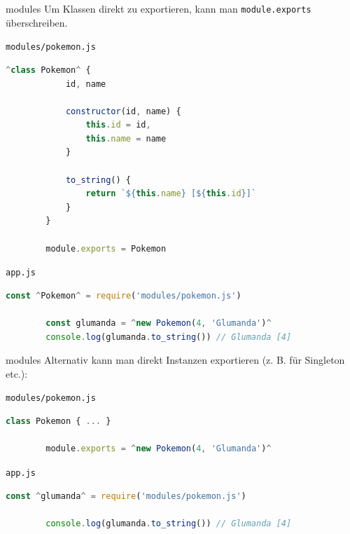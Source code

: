 \begin{example}{modules}
    Um Klassen direkt zu exportieren, kann man \texttt{module.exports} überschreiben.

    \texttt{modules/pokemon.js}
    \begin{lstlisting}[language=JavaScript]
        ^class Pokemon^ {
            id, name

            constructor(id, name) {
                this.id = id,
                this.name = name
            }

            to_string() {
                return `${this.name} [${this.id}]`
            }
        }

        module.exports = Pokemon
    \end{lstlisting}

    \texttt{app.js}
    \begin{lstlisting}[language=JavaScript]
        const ^Pokemon^ = require('modules/pokemon.js')

        const glumanda = ^new Pokemon(4, 'Glumanda')^
        console.log(glumanda.to_string()) // Glumanda [4]
    \end{lstlisting}
\end{example}

\begin{example}{modules}
    Alternativ kann man direkt Instanzen exportieren (z. B. für Singleton etc.):

    \texttt{modules/pokemon.js}
    \begin{lstlisting}[language=JavaScript]
        class Pokemon { ... }

        module.exports = ^new Pokemon(4, 'Glumanda')^
    \end{lstlisting}

    \texttt{app.js}
    \begin{lstlisting}[language=JavaScript]
        const ^glumanda^ = require('modules/pokemon.js')

        console.log(glumanda.to_string()) // Glumanda [4]
    \end{lstlisting}
\end{example}

